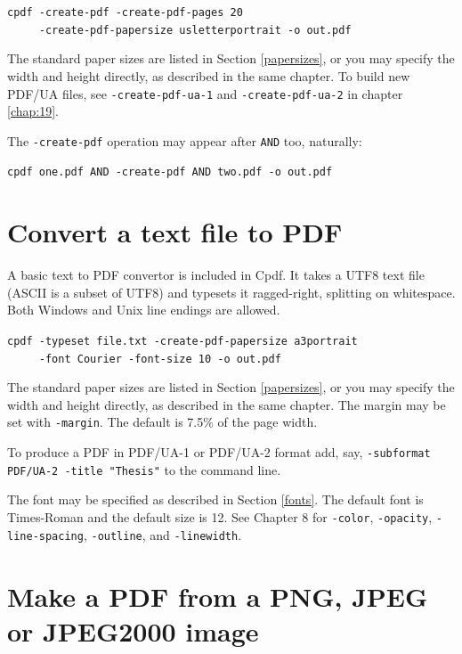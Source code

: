 \documentclass{book}
\begin{document}
\begin{framed}
 \noindent\small\verb?cpdf -create-pdf -create-pdf-pages 20?\\
 \noindent\small\verb?     -create-pdf-papersize usletterportrait -o out.pdf?
\end{framed}

\noindent The standard paper sizes are listed in Section \ref{papersizes}, or you may specify the width and height directly, as described in the same chapter. To build new PDF/UA files, see \texttt{-create-pdf-ua-1} and \texttt{-create-pdf-ua-2} in chapter \ref{chap:19}.

The \texttt{-create-pdf} operation may appear after \texttt{AND} too, naturally:

\begin{framed}
 \noindent\small\verb?cpdf one.pdf AND -create-pdf AND two.pdf -o out.pdf?
\end{framed}

\section{Convert a text file to PDF}
A basic text to PDF convertor is included in Cpdf. It takes a UTF8 text file (ASCII is a subset of UTF8) and typesets it ragged-right, splitting on whitespace. Both Windows and Unix line endings are allowed. 

\begin{framed}
 \noindent\small\verb?cpdf -typeset file.txt -create-pdf-papersize a3portrait?\\
 \noindent\small\verb?     -font Courier -font-size 10 -o out.pdf?
\end{framed}

\noindent The standard paper sizes are listed in Section \ref{papersizes}, or you may specify the width and height directly, as described in the same chapter. The margin may be set with \texttt{-margin}. The default is 7.5\% of the page width.

To produce a PDF in PDF/UA-1 or PDF/UA-2 format add, say, \texttt{-subformat PDF/UA-2 -title "Thesis"} to the command line.

The font may be specified as described in Section \ref{fonts}. The default font is Times-Roman and the default size is 12. See Chapter 8 for \texttt{-color}, \texttt{-opacity}, \texttt{-line-spacing}, \texttt{-outline}, and \texttt{-linewidth}.

\section{Make a PDF from a PNG, JPEG or JPEG2000 image}
\end{document}
